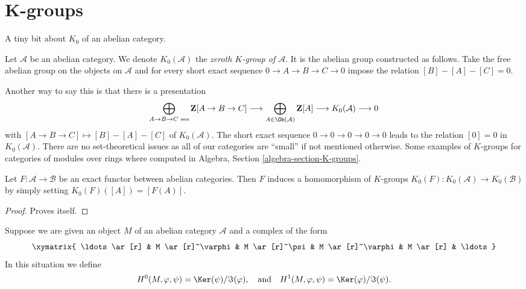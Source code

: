 \section{K-groups}
\label{section-K-groups}

\noindent
A tiny bit about $K_0$ of an abelian category.

\begin{definition}
\label{definition-K-zero}
Let $\mathcal{A}$ be an abelian category.
We denote $K_0(\mathcal{A})$ the
{\it zeroth $K$-group of $\mathcal{A}$}.
It is the abelian group constructed as follows.
Take the free abelian group
on the objects on $\mathcal{A}$
and for every short exact sequence
$0 \to A \to B \to C \to 0$
impose the relation $[B] - [A] - [C] = 0$.
\end{definition}

\noindent
Another way to say this is that there is a presentation
$$
\bigoplus_{A \to B \to C\text{ ses}}
\mathbf{Z}[A \to B \to C]
\longrightarrow
\bigoplus_{A \in \Ob(\mathcal{A})}
\mathbf{Z}[A]
\longrightarrow
K_0(\mathcal{A})
\longrightarrow
0
$$
with $[A \to B \to C] \mapsto [B] - [A] - [C]$ of $K_0(\mathcal{A})$.
The short exact sequence $0 \to 0 \to 0 \to 0 \to 0$
leads to the relation $[0] = 0$ in $K_0(\mathcal{A})$.
There are no set-theoretical issues as all of our categories
are ``small'' if not mentioned otherwise.
Some examples of $K$-groups for categories of modules
over rings where computed in
Algebra, Section \ref{algebra-section-K-groups}.

\begin{lemma}
\label{lemma-exact-functor-K-groups}
Let $F : \mathcal{A} \to \mathcal{B}$ be an exact functor between
abelian categories. Then $F$ induces a homomorphism of $K$-groups
$K_0(F) : K_0(\mathcal{A}) \to K_0(\mathcal{B})$ by simply setting
$K_0(F)([A]) = [F(A)]$.
\end{lemma}

\begin{proof}
Proves itself.
\end{proof}

\noindent
Suppose we are given an object $M$ of an abelian category $\mathcal{A}$
and a complex of the form
\begin{equation}
\label{equation-cyclic-complex}
\xymatrix{
\ldots \ar[r] &
M \ar[r]^\varphi &
M \ar[r]^\psi &
M \ar[r]^\varphi &
M \ar[r] & \ldots
}
\end{equation}
In this situation we define
$$
H^0(M, \varphi, \psi) = \Ker(\psi)/\Im(\varphi)
, \quad\text{and}\quad
H^1(M, \varphi, \psi) = \Ker(\varphi)/\Im(\psi).
$$

